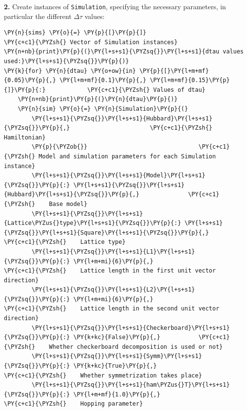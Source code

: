     \textbf{2.} Create instances of \texttt{Simulation}, specifying the
necessary parameters, in particular the different \(\Delta \tau\)
values:

    \begin{tcolorbox}[breakable, size=fbox, boxrule=1pt, pad at break*=1mm,colback=cellbackground, colframe=cellborder]
\begin{Verbatim}[commandchars=\\\{\}]
\PY{n}{sims} \PY{o}{=} \PY{p}{[}\PY{p}{]}                                \PY{c+c1}{\PYZsh{} Vector of Simulation instances}
\PY{n+nb}{print}\PY{p}{(}\PY{l+s+s1}{\PYZsq{}}\PY{l+s+s1}{dtau values used:}\PY{l+s+s1}{\PYZsq{}}\PY{p}{)}
\PY{k}{for} \PY{n}{dtau} \PY{o+ow}{in} \PY{p}{[}\PY{l+m+mf}{0.05}\PY{p}{,} \PY{l+m+mf}{0.1}\PY{p}{,} \PY{l+m+mf}{0.15}\PY{p}{]}\PY{p}{:}            \PY{c+c1}{\PYZsh{} Values of dtau}
    \PY{n+nb}{print}\PY{p}{(}\PY{n}{dtau}\PY{p}{)}
    \PY{n}{sim} \PY{o}{=} \PY{n}{Simulation}\PY{p}{(}
        \PY{l+s+s1}{\PYZsq{}}\PY{l+s+s1}{Hubbard}\PY{l+s+s1}{\PYZsq{}}\PY{p}{,}                       \PY{c+c1}{\PYZsh{} Hamiltonian}
        \PY{p}{\PYZob{}}                                \PY{c+c1}{\PYZsh{} Model and simulation parameters for each Simulation instance}
        \PY{l+s+s1}{\PYZsq{}}\PY{l+s+s1}{Model}\PY{l+s+s1}{\PYZsq{}}\PY{p}{:} \PY{l+s+s1}{\PYZsq{}}\PY{l+s+s1}{Hubbard}\PY{l+s+s1}{\PYZsq{}}\PY{p}{,}              \PY{c+c1}{\PYZsh{}    Base model}
        \PY{l+s+s1}{\PYZsq{}}\PY{l+s+s1}{Lattice\PYZus{}type}\PY{l+s+s1}{\PYZsq{}}\PY{p}{:} \PY{l+s+s1}{\PYZsq{}}\PY{l+s+s1}{Square}\PY{l+s+s1}{\PYZsq{}}\PY{p}{,}        \PY{c+c1}{\PYZsh{}    Lattice type}
        \PY{l+s+s1}{\PYZsq{}}\PY{l+s+s1}{L1}\PY{l+s+s1}{\PYZsq{}}\PY{p}{:} \PY{l+m+mi}{6}\PY{p}{,}                         \PY{c+c1}{\PYZsh{}    Lattice length in the first unit vector direction}
        \PY{l+s+s1}{\PYZsq{}}\PY{l+s+s1}{L2}\PY{l+s+s1}{\PYZsq{}}\PY{p}{:} \PY{l+m+mi}{6}\PY{p}{,}                         \PY{c+c1}{\PYZsh{}    Lattice length in the second unit vector direction}
        \PY{l+s+s1}{\PYZsq{}}\PY{l+s+s1}{Checkerboard}\PY{l+s+s1}{\PYZsq{}}\PY{p}{:} \PY{k+kc}{False}\PY{p}{,}           \PY{c+c1}{\PYZsh{}    Whether checkerboard decomposition is used or not}
        \PY{l+s+s1}{\PYZsq{}}\PY{l+s+s1}{Symm}\PY{l+s+s1}{\PYZsq{}}\PY{p}{:} \PY{k+kc}{True}\PY{p}{,}                    \PY{c+c1}{\PYZsh{}    Whether symmetrization takes place}
        \PY{l+s+s1}{\PYZsq{}}\PY{l+s+s1}{ham\PYZus{}T}\PY{l+s+s1}{\PYZsq{}}\PY{p}{:} \PY{l+m+mf}{1.0}\PY{p}{,}                    \PY{c+c1}{\PYZsh{}    Hopping parameter}

\end{Verbatim}
\end{tcolorbox}
